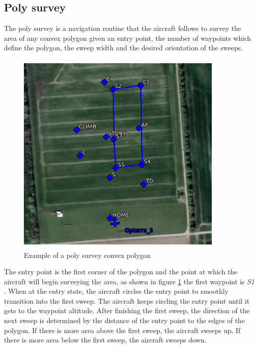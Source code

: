 \subsection{Poly survey}
The poly survey is a navigation routine that the aircraft follows to survey the area of any convex polygon given an entry point, the number of waypoints which define the polygon, the sweep width and the desired orientation of the sweeps.
\begin{figure}[H]
\centering
\includegraphics[width=10cm,height=10cm,keepaspectratio]{imagenes/Convex_polygon.png}
\caption{Example of a poly survey convex polygon}
\label{fig:Convex_poly}
\end{figure}
The entry point is the first corner of the polygon and the point at which the aircraft will begin surveying the area, as shown in figure \ref{fig:Convex_poly} the first waypoint is  \textit{S1} . When at the entry state, the aircraft circles the entry point to smoothly transition into the first sweep. The aircraft keeps circling the entry point until it gets to the waypoint altitude. After finishing the first sweep, the direction of the next sweep is determined by the distance of the entry point to the edges of the polygon. If there is more area above the first sweep, the aircraft sweeps up. If there is more area below the first sweep, the aircraft sweeps down.\cite{Poly_survey}

